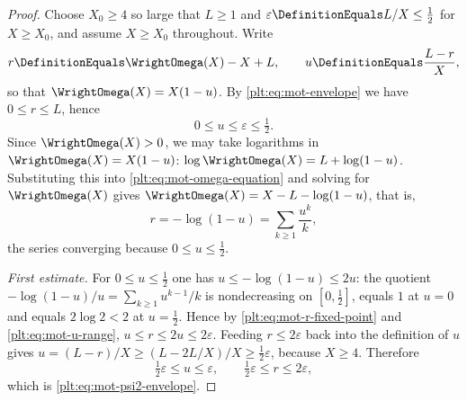 \documentclass[11pt,oneside]{article}
\theoremstyle{plain}
\theoremstyle{definition}
\theoremstyle{remark}
\begin{document}
\begin{proof}
Choose \(X_{0}\ge4\) so large that \(L\ge1\) and
\(\varepsilon\DefinitionEquals L/X\le\tfrac12\) for \(X\ge X_{0}\), and assume
\(X\ge X_{0}\) throughout.  Write
\[
  r\DefinitionEquals\WrightOmega(X)-X+L,
  \qquad
  u\DefinitionEquals\frac{L-r}{X},
\]
so that \(\WrightOmega(X)=X(1-u)\).  By \eqref{plt:eq:mot-envelope} we have
\(0\le r\le L\), hence
\begin{equation}\label{plt:eq:mot-u-range}
  0\le u\le\varepsilon\le\tfrac12 .
\end{equation}
Since \(\WrightOmega(X)>0\), we may take logarithms in
\(\WrightOmega(X)=X(1-u)\):
\(\log\WrightOmega(X)=L+\log(1-u)\).  Substituting this into
\eqref{plt:eq:mot-omega-equation} and solving for \(\WrightOmega(X)\) gives
\(\WrightOmega(X)=X-L-\log(1-u)\), that is,
\begin{equation}\label{plt:eq:mot-r-fixed-point}
  r=-\log(1-u)=\sum_{k\ge1}\frac{u^{k}}{k},
\end{equation}
the series converging because \(0\le u\le\tfrac12\).

\emph{First estimate.}  For \(0\le u\le\tfrac12\) one has
\(u\le-\log(1-u)\le2u\): the quotient \(-\log(1-u)/u=\sum_{k\ge1}u^{k-1}/k\) is
nondecreasing on \([0,\tfrac12]\), equals \(1\) at \(u=0\) and equals
\(2\log2<2\) at \(u=\tfrac12\).  Hence by
\eqref{plt:eq:mot-r-fixed-point} and \eqref{plt:eq:mot-u-range},
\(u\le r\le2u\le2\varepsilon\).  Feeding \(r\le2\varepsilon\) back into the
definition of \(u\) gives
\(u=(L-r)/X\ge(L-2L/X)/X\ge\tfrac12\varepsilon\), because \(X\ge4\).  Therefore
\begin{equation}\label{plt:eq:mot-r-two-sided}
  \tfrac12\varepsilon\le u\le\varepsilon,
  \qquad
  \tfrac12\varepsilon\le r\le2\varepsilon,
\end{equation}
which is \eqref{plt:eq:mot-psi2-envelope}.


\end{proof}
\end{document}
